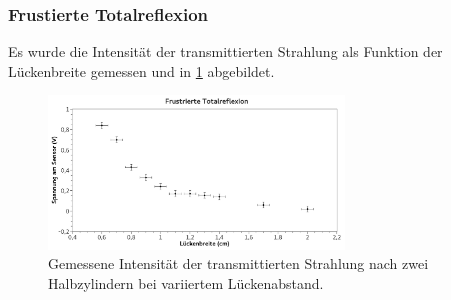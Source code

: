 \documentclass[
	a4paper,
	12pt,
	pagesize,
	ngerman
]{scrartcl}
\begin{document}
	\subsubsection{Frustierte Totalreflexion}
	Es wurde die Intensität der transmittierten Strahlung als Funktion der Lückenbreite gemessen und in \cref{fig_frust_total} abgebildet.
	\begin{figure}[H] %
		\includegraphics[width=0.7\textwidth]{fig_frust_total}
		\centering
		\caption{Gemessene Intensität der transmittierten Strahlung nach zwei Halbzylindern bei variiertem Lückenabstand.}
		\label{fig_frust_total}
		\centering
	\end{figure}
\end{document}
